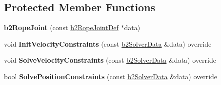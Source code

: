 \subsection*{Protected Member Functions}
\begin{DoxyCompactItemize}
\item 
\mbox{\label{classb2_rope_joint_a3f69f238616d8dc622d9448f81e14e53}} 
{\bfseries b2\+Rope\+Joint} (const \hyperlink{structb2_rope_joint_def}{b2\+Rope\+Joint\+Def} $\ast$data)
\item 
\mbox{\label{classb2_rope_joint_a8a9bd57a12aaf38b529ae626e714e1e8}} 
void {\bfseries Init\+Velocity\+Constraints} (const \hyperlink{structb2_solver_data}{b2\+Solver\+Data} \&data) override
\item 
\mbox{\label{classb2_rope_joint_a08bf8f6cffe281a9f58ee469f99bf5b1}} 
void {\bfseries Solve\+Velocity\+Constraints} (const \hyperlink{structb2_solver_data}{b2\+Solver\+Data} \&data) override
\item 
\mbox{\label{classb2_rope_joint_a2fcbda6d472c660aa01793c798a8f92e}} 
bool {\bfseries Solve\+Position\+Constraints} (const \hyperlink{structb2_solver_data}{b2\+Solver\+Data} \&data) override
\end{DoxyCompactItemize}
